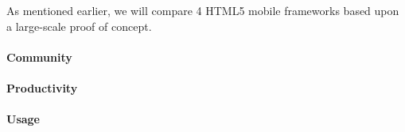 \documentclass[a4paper]{article}
\begin{document}
As mentioned earlier,  we will compare 4 HTML5 mobile frameworks based upon a large-scale proof of concept.  



\paragraph{Community}%
% 
% 
\paragraph{Productivity}%
% 
% 
\paragraph{Usage}%
% 
% 
\end{document}
